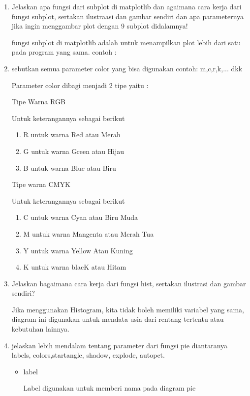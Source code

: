 \begin{enumerate}
\item Jelaskan apa fungsi dari subplot di matplotlib dan agaimana cara kerja dari fungsi subplot, sertakan ilustraasi dan gambar sendiri dan apa parameternya jika ingin menggambar plot dengan 9 subplot didalamnya!

fungsi subplot di matplotlib adalah untuk menampilkan plot lebih dari satu pada program yang sama.
contoh :


\item sebutkan semua parameter color yang bisa digunakan contoh: m,c,r,k,... dkk

Parameter color dibagi menjadi 2 tipe yaitu :

Tipe Warna RGB

Untuk keterangannya sebagai berikut
\begin{enumerate}
\item R untuk warna Red atau Merah
\item G untuk warna Green atau Hijau
\item B untuk warna Blue atau Biru
\end{enumerate}
Tipe warna CMYK

Untuk keterangannya sebagai berikut
\begin{enumerate}
\item    C untuk warna Cyan atau Biru Muda
\item    M untuk warna Mangenta atau Merah Tua
\item    Y untuk warna Yellow Atau Kuning
 \item   K untuk warna blacK atau Hitam
\end{enumerate}

\item Jelaskan bagaimana cara kerja dari fungsi hist, sertakan ilustrasi dan gambar sendiri?

Jika menggunakan Histogram, kita tidak boleh memiliki variabel yang sama, diagram ini digunakan untuk mendata usia dari rentang tertentu atau kebutuhan lainnya.


\item jelaskan lebih mendalam tentang parameter dari fungsi pie diantaranya labels, colors,startangle, shadow, explode, autopct.

\begin{itemize}
    \item label

    Label digunakan untuk memberi nama pada diagram pie


\end{itemize}
\end{enumerate}
